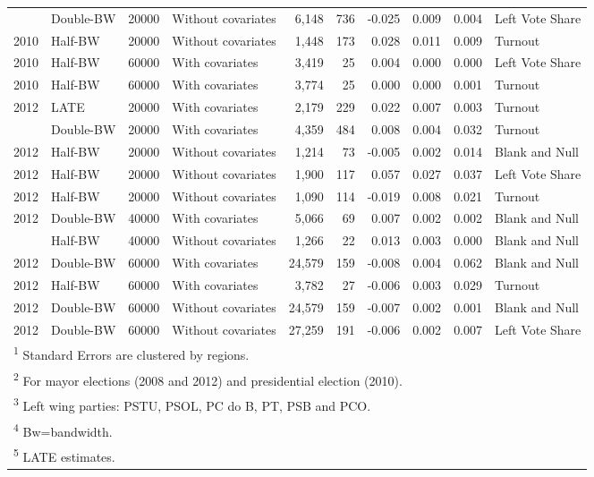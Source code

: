 \documentclass[12pt,]{article}
\begin{document}
\begin{landscape}
\begin{table}[!h]
\begin{tabular}{llllrrrrrl}
\addlinespace
2010 & Double-BW & 20000 & Without covariates & 6,148 & 736 & -0.025 & 0.009 & 0.004 & Left Vote Share\\
2010 & Half-BW & 20000 & Without covariates & 1,448 & 173 & 0.028 & 0.011 & 0.009 & Turnout\\
2010 & Half-BW & 60000 & With covariates & 3,419 & 25 & 0.004 & 0.000 & 0.000 & Left Vote Share\\
2010 & Half-BW & 60000 & With covariates & 3,774 & 25 & 0.000 & 0.000 & 0.001 & Turnout\\
2012 & LATE & 20000 & With covariates & 2,179 & 229 & 0.022 & 0.007 & 0.003 & Turnout\\
\addlinespace
2012 & Double-BW & 20000 & With covariates & 4,359 & 484 & 0.008 & 0.004 & 0.032 & Turnout\\
2012 & Half-BW & 20000 & Without covariates & 1,214 & 73 & -0.005 & 0.002 & 0.014 & Blank and Null\\
2012 & Half-BW & 20000 & Without covariates & 1,900 & 117 & 0.057 & 0.027 & 0.037 & Left Vote Share\\
2012 & Half-BW & 20000 & Without covariates & 1,090 & 114 & -0.019 & 0.008 & 0.021 & Turnout\\
2012 & Double-BW & 40000 & With covariates & 5,066 & 69 & 0.007 & 0.002 & 0.002 & Blank and Null\\
\addlinespace
2012 & Half-BW & 40000 & Without covariates & 1,266 & 22 & 0.013 & 0.003 & 0.000 & Blank and Null\\
2012 & Double-BW & 60000 & With covariates & 24,579 & 159 & -0.008 & 0.004 & 0.062 & Blank and Null\\
2012 & Half-BW & 60000 & With covariates & 3,782 & 27 & -0.006 & 0.003 & 0.029 & Turnout\\
2012 & Double-BW & 60000 & Without covariates & 24,579 & 159 & -0.007 & 0.002 & 0.001 & Blank and Null\\
2012 & Double-BW & 60000 & Without covariates & 27,259 & 191 & -0.006 & 0.002 & 0.007 & Left Vote Share\\
\bottomrule
\multicolumn{10}{l}{\textsuperscript{1} Standard Errors are clustered by regions.}\\
\multicolumn{10}{l}{\textsuperscript{2} For mayor elections (2008 and 2012) and presidential election (2010).}\\
\multicolumn{10}{l}{\textsuperscript{3} Left wing parties: PSTU, PSOL, PC do B, PT, PSB and PCO.}\\
\multicolumn{10}{l}{\textsuperscript{4} Bw=bandwidth.}\\
\multicolumn{10}{l}{\textsuperscript{5} LATE estimates.}\\
\end{tabular}
\end{table}
\end{landscape}
\end{document}
